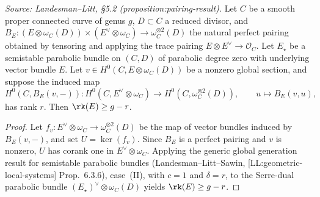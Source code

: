 \begin{proposition}
  \label{proposition:pairing-result}
  \textit{Source: Landesman--Litt, §5.2 (proposition:pairing-result).}
  Let $C$ be a smooth proper connected curve of genus $g$, $D \subset C$ a
  reduced divisor, and $B_E\colon (E \otimes \omega_C(D)) \times
  (E^\vee \otimes \omega_C) \to \omega_C^{\otimes 2}(D)$ the natural perfect
  pairing obtained by tensoring and applying the trace pairing
  $E \otimes E^\vee \to \mathcal{O}_C$.
  Let $E_\star$ be a semistable parabolic bundle on $(C, D)$ of parabolic
  degree zero with underlying vector bundle $E$.
  Let $v \in H^0(C, E \otimes \omega_C(D))$ be a nonzero global section, and
  suppose the induced map
  \[
    H^0(C, B_E(v, -))\colon H^0(C, E^\vee \otimes \omega_C)
    \to H^0(C, \omega_C^{\otimes 2}(D)),
    \qquad u \mapsto B_E(v, u),
  \]
  has rank $r$.
  Then $\rk(E) \geq g - r$.
\end{proposition}

\begin{proof}
  Let $f_v\colon E^\vee \otimes \omega_C \to \omega_C^{\otimes 2}(D)$ be the map
  of vector bundles induced by $B_E(v, -)$, and set $U = \ker(f_v)$.
  Since $B_E$ is a perfect pairing and $v$ is nonzero, $U$ has corank one in
  $E^\vee \otimes \omega_C$.
  Applying the generic global generation result for semistable parabolic
  bundles (Landesman--Litt--Sawin, [LL:geometric-local-systems] Prop.~6.3.6),
  case~(II), with $c = 1$ and $\delta = r$, to the Serre-dual parabolic bundle
  $(E_\star)^\vee \otimes \omega_C(D)$ yields $\rk(E) \geq g - r$.
\end{proof}

